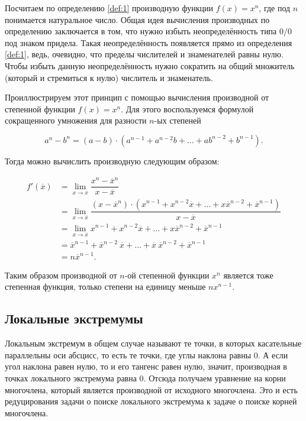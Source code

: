 \documentclass[12pt]{article}
\begin{document}
\par Посчитаем по определению \ref{def:1} производную функции $f(x) = x^n$, где под $n$ понимается натуральное число. Общая идея вычисления производных по определению заключается в том, что нужно избыть неопределённость типа $0/0$ под знаком придела. Такая неопределённость появляется прямо из определения \ref{def:1}, ведь, очевидно, что пределы числителей и знаменателей равны нулю. Чтобы избыть данную неопределённость нужно сократить на общий множитель (который и стремиться к нулю) числитель и знаменатель.

\par Проиллюстрируем этот принцип с помощью вычисления производной от степенной функции $f(x) = x^n$. Для этого воспользуемся формулой сокращенного умножения \cite{sok_um} для разности $n$\--ых степеней

\begin{equation}
	a^n - b^n = (a-b)\cdot(a^{n-1} + a^{n-2}b + \ldots + ab^{n-2} + b^{n-1}).
\end{equation}

Тогда можно вычислить производную следующим образом:

\begin{equation}\label{eq:69}
\begin{split}
	f'(\overline{x}) &= \lim_{x\rightarrow\overline{x}}\dfrac{x^n - \overline{x}^n}{x - \overline{x}}\\
	&= \lim_{x\rightarrow\overline{x}} \dfrac{(x-\overline{x}^n)\cdot(x^{n-1} + x^{n-2}\overline{x} + \ldots + x\overline{x}^{n-2} + \overline{x}^{n-1})}{x - \overline{x}}\\
	&= \lim_{x\rightarrow\overline{x}} x^{n-1} + x^{n-2}\overline{x} + \ldots + x\overline{x}^{n-2} + \overline{x}^{n-1}\\
	&= \overline{x}^{n-1} + \overline{x}^{n-2}\ \overline{x} + \ldots + \overline{x}\ \overline{x}^{n-2} + \overline{x}^{n-1}\\
	&= n \overline{x}^{n-1}.
\end{split}
\end{equation}

Таким образом производной от $n$\--ой степенной функции $x^n$ является тоже степенная функция, только степени на единицу меньше $nx^{n-1}$.

\subsection{Локальные экстремумы}
Локальным экстремум в общем случае называют те точки, в которых касательные параллельны оси абсцисс, то есть те точки, где углы наклона равны $0$. А если угол наклона равен нулю, то и его тангенс равен нулю, значит, производная в точках локального экстремума равна $0$. Отсюда получаем уравнение на корни многочлена, который является производной от исходного многочлена. Это и есть редуцирования задачи о поиске локального экстремума к задаче о поиске корней многочлена.
\end{document}
